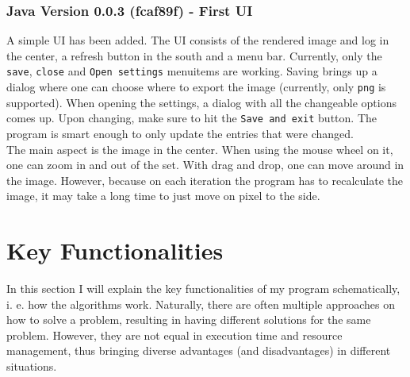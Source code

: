 \documentclass[10pt,a4paper,titlepage]{article}
\begin{document}
	\subsubsection{Java Version 0.0.3 (fcaf89f) - First UI}
	A simple UI has been added. The UI consists of the rendered image and log in the center, a refresh button in the south and a menu bar. Currently, only the \verb|save|, \verb|close| and \verb|Open settings| menuitems are working. Saving brings up a dialog where one can choose where to export the image (currently, only \verb|png| is supported). When opening the settings, a dialog with all the changeable options comes up. Upon changing, make sure to hit the \verb|Save and exit| button. The program is smart enough to only update the entries that were changed.\\
	The main aspect is the image in the center. When using the mouse wheel on it, one can zoom in and out of the set. With drag and drop, one can move around in the image. However, because on each iteration the program has to recalculate the image, it may take a long time to just move on pixel to the side.
	
	
	\section{Key Functionalities}
	In this section I will explain the key functionalities of my program schematically, i. e. how the algorithms work. Naturally, there are often multiple approaches on how to solve a problem, resulting in having different solutions for the same problem. However, they are not equal in execution time and resource management, thus bringing diverse advantages (and disadvantages) in different situations.
\end{document}
